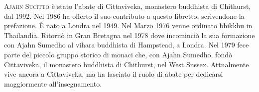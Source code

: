 {{
{\scshape Ajahn Sucitto} è stato l'abate di Cittaviveka, monastero buddhista di Chithurst, dal 1992. Nel 1986 ha offerto il suo contributo a questo libretto, scrivendone la prefazione. È nato a Londra nel 1949. Nel Marzo 1976 venne ordinato bhikkhu in Thailandia. Ritornò in Gran Bretagna nel 1978 dove incominciò la sua formazione con Ajahn Sumedho al vihara buddhista di Hampstead, a Londra. Nel 1979 fece parte del piccolo gruppo storico di monaci che, con Ajahn Sumedho, fondò Cittaviveka, il monastero buddhista di Chithurst, nel West Sussex. Attualmente vive ancora a Cittaviveka, ma ha lasciato il ruolo di abate per dedicarsi maggiormente all'insegnamento.}

}

